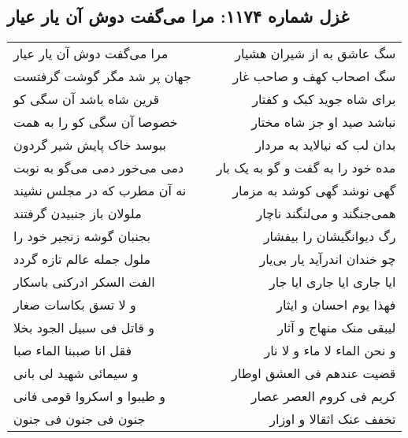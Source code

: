 \begin{center}
\section*{غزل شماره ۱۱۷۴: مرا می‌گفت دوش آن یار عیار}
\label{sec:1174}
\begin{longtable}{l p{0.5cm} r}
مرا می‌گفت دوش آن یار عیار
&&
سگ عاشق به از شیران هشیار
\\
جهان پر شد مگر گوشت گرفتست
&&
سگ اصحاب کهف و صاحب غار
\\
قرین شاه باشد آن سگی کو
&&
برای شاه جوید کبک و کفتار
\\
خصوصا آن سگی کو را به همت
&&
نباشد صید او جز شاه مختار
\\
ببوسد خاک پایش شیر گردون
&&
بدان لب که نیالاید به مردار
\\
دمی می‌خور دمی می‌گو به نوبت
&&
مده خود را به گفت و گو به یک بار
\\
نه آن مطرب که در مجلس نشیند
&&
گهی نوشد گهی کوشد به مزمار
\\
ملولان باز جنبیدن گرفتند
&&
همی‌جنگند و می‌لنگند ناچار
\\
بجنبان گوشه زنجیر خود را
&&
رگ دیوانگیشان را بیفشار
\\
ملول جمله عالم تازه گردد
&&
چو خندان اندرآید یار بی‌یار
\\
الفت السکر ادرکنی باسکار
&&
ایا جاری ایا جاری ایا جار
\\
و لا تسق بکاسات صغار
&&
فهذا یوم احسان و ایثار
\\
و قاتل فی سبیل الجود بخلا
&&
لیبقی منک منهاج و آثار
\\
فقل انا صببنا الماء صبا
&&
و نحن الماء لا ماء و لا نار
\\
و سیمائی شهید لی بانی
&&
قضیت عندهم فی العشق اوطار
\\
و طیبوا و اسکروا قومی فانی
&&
کریم فی کروم العصر عصار
\\
جنون فی جنون فی جنون
&&
تخفف عنک اثقالا و اوزار
\\
\end{longtable}
\end{center}

